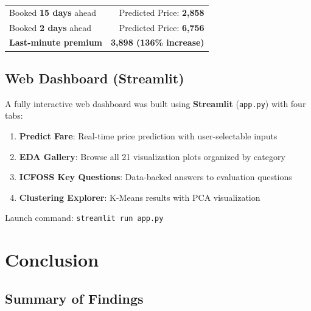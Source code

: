 \documentclass[12pt, a4paper]{article}
\newcommand{\rupee}{\text{₹}}
\begin{document}
\begin{resultbox}
\begin{tabular}{l r}
Booked \textbf{15 days} ahead  & Predicted Price: \textbf{\rupee2,858} \\
Booked \textbf{2 days} ahead   & Predicted Price: \textbf{\rupee6,756} \\
\textbf{Last-minute premium}   & \textbf{\rupee3,898 (136\% increase)} \\
\end{tabular}
\end{resultbox}

\subsection{Web Dashboard (Streamlit)}

A fully interactive web dashboard was built using \textbf{Streamlit} (\texttt{app.py}) with four tabs:
\begin{enumerate}[leftmargin=*]
    \item \textbf{Predict Fare}: Real-time price prediction with user-selectable inputs
    \item \textbf{EDA Gallery}: Browse all 21 visualization plots organized by category
    \item \textbf{ICFOSS Key Questions}: Data-backed answers to evaluation questions
    \item \textbf{Clustering Explorer}: K-Means results with PCA visualization
\end{enumerate}

Launch command: \texttt{streamlit run app.py}

\newpage

\section{Conclusion}

\subsection{Summary of Findings}
\end{document}
